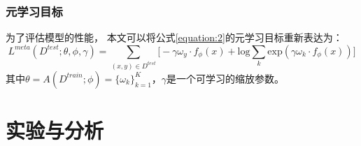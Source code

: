 
\subsection{元学习目标}

为了评估模型的性能，
本文可以将公式\ref{equation:2}的元学习目标重新表达为：
\begin{equation}
    \label{equation:12}
    L^{meta}(D^{test};\theta,\phi,\gamma)=\sum_{(x,y) \in D^{test}}{ \big[ -\gamma \omega_{y} \cdot f_{\phi}(x) + \mathrm{log}\sum_{k}{\mathrm{exp}(\gamma\omega_{k}\cdot f_{\phi}(x))}\big]}
\end{equation}
其中$\theta=A(D^{train};\phi)=\{\omega_{k}\}_{k=1}^{K}$，$\gamma$是一个可学习的缩放参数。\\

\vspace*{6pt}
   
\endgroup
\begingroup
\let\clearpage\relax

\chapter{实验与分析}



